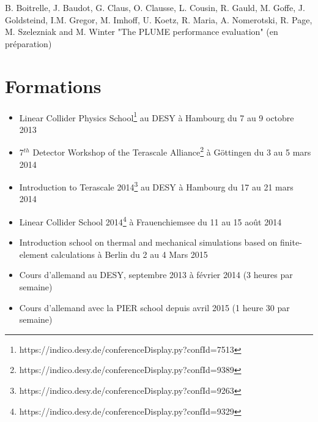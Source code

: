   B. Boitrelle, J. Baudot, G. Claus, O. Clausse, L. Cousin, R. Gauld, M. Goffe, J. Goldsteind, I.M. Gregor, M. Imhoff, U. Koetz, R. Maria, A. Nomerotski, R. Page, M. Szelezniak and M. Winter "The PLUME performance evaluation" (en préparation)

  \section*{Formations}
 
  \begin{itemize}
    \item Linear Collider Physics School\footnote{https://indico.desy.de/conferenceDisplay.py?confId=7513} au DESY à Hambourg du 7 au 9 octobre 2013
    \item 7$^{th}$ Detector Workshop of the Terascale Alliance\footnote{https://indico.desy.de/conferenceDisplay.py?confId=9389} à Göttingen du 3 au 5 mars 2014
    \item Introduction to Terascale 2014\footnote{https://indico.desy.de/conferenceDisplay.py?confId=9263} au DESY à Hambourg du 17 au 21 mars 2014
    \item Linear Collider School 2014\footnote{https://indico.desy.de/conferenceDisplay.py?confId=9329} à Frauenchiemsee du 11 au 15 août 2014
    \item Introduction school on thermal and mechanical simulations based on finite-element calculations à Berlin du 2 au 4 Mars 2015
    \item Cours d'allemand au DESY, septembre 2013 à février 2014 (3 heures par semaine)
    \item Cours d'allemand avec la PIER school depuis avril 2015 (1 heure 30 par semaine)
  \end{itemize}
